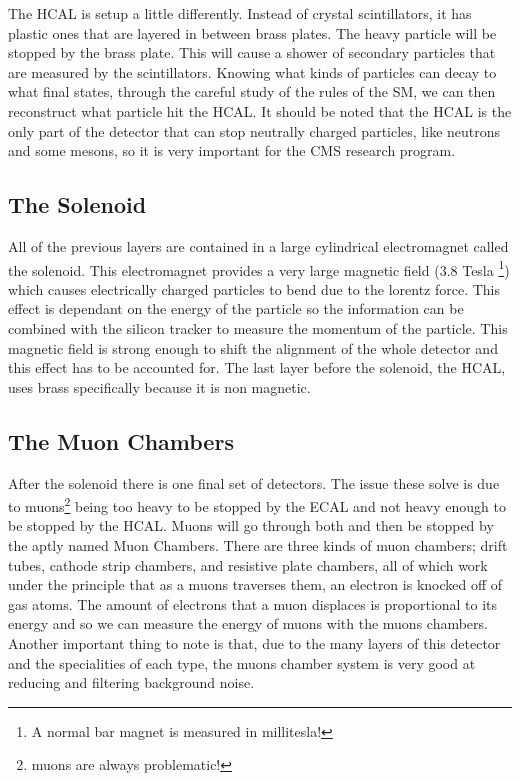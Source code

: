 The HCAL is setup a little differently. Instead of crystal scintillators, it has plastic ones that are layered in between brass plates.
The heavy particle will be stopped by the brass plate. This will cause a shower of secondary particles that are measured by the scintillators.
Knowing what kinds of particles can decay to what final states, through the careful study of the rules of the SM, we can then reconstruct what particle hit the HCAL.
It should be noted that the HCAL is the only part of the detector that can stop neutrally charged particles, like neutrons and some mesons, so it is very important for the CMS research program.

\subsection{The Solenoid}

All of the previous layers are contained in a large cylindrical electromagnet called the solenoid.
This electromagnet provides a very large magnetic field (3.8 Tesla \footnote{A normal bar magnet is measured in millitesla!}) which causes electrically charged particles to bend due to the lorentz force.
This effect is dependant on the energy of the particle so the information can be combined with the silicon tracker to measure the momentum of the particle.
This magnetic field is strong enough to shift the alignment of the whole detector and this effect has to be accounted for.
The last layer before the solenoid, the HCAL, uses brass specifically because it is non magnetic. 

\subsection{The Muon Chambers}

After the solenoid there is one final set of detectors. The issue these solve is due to muons\footnote{muons are always problematic!} being too heavy to be stopped by the ECAL and not heavy enough to be stopped by the HCAL.
Muons will go through both and then be stopped by the aptly named Muon Chambers. There are three kinds of muon chambers; drift tubes, cathode strip chambers, and resistive plate chambers, all of which work under the principle that as a muons traverses them, an electron is knocked off of gas atoms.
The amount of electrons that a muon displaces is proportional to its energy and so we can measure the energy of muons with the muons chambers.
Another important thing to note is that, due to the many layers of this detector and the specialities of each type, the muons chamber system is very good at reducing and filtering background noise.


